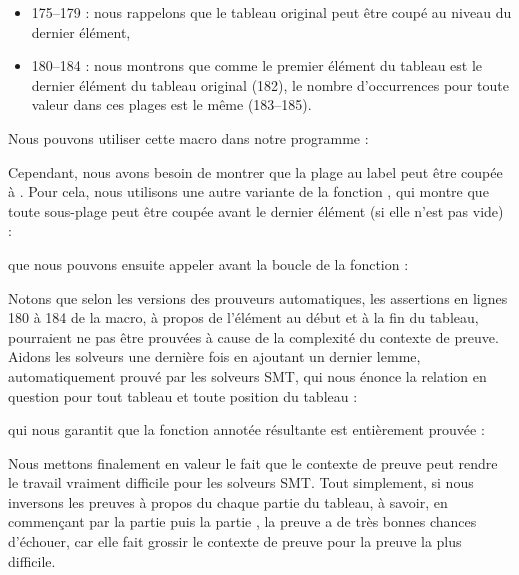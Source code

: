 \begin{itemize}
    \item 175--179 : nous rappelons que le tableau original peut être coupé au
          niveau du dernier élément,
    \item 180--184 : nous montrons que comme le premier élément du tableau est le
          dernier élément du tableau original (182), le nombre d'occurrences pour
          toute valeur dans ces plages est le même (183--185).
\end{itemize}


Nous pouvons utiliser cette macro dans notre programme :




Cependant, nous avons besoin de montrer que la plage au label  peut
être coupée à  . Pour cela, nous utilisons une autre variante de la
fonction , qui montre que toute sous-plage peut être coupée avant
le dernier élément (si elle n'est pas vide) :




que nous pouvons ensuite appeler avant la boucle de la fonction  :




Notons que selon les versions des prouveurs automatiques, les assertions en lignes
180 à 184 de la macro, à propos de l'élément au début et à la fin du tableau,
pourraient ne pas être prouvées à cause de la complexité du contexte de preuve.
Aidons les solveurs une dernière fois en ajoutant un dernier lemme, automatiquement
prouvé par les solveurs SMT, qui nous énonce la relation en question pour tout
tableau et toute position du tableau :




qui nous garantit que la fonction annotée résultante est entièrement prouvée :




Nous mettons finalement en valeur le fait que le contexte de preuve peut rendre
le travail vraiment difficile pour les solveurs SMT. Tout simplement, si nous
inversons les preuves à propos du chaque partie du tableau, à savoir, en
commençant par la partie  puis la partie ,
la preuve a de très bonnes chances d'échouer, car elle fait grossir le contexte de
preuve pour la preuve la plus difficile.


